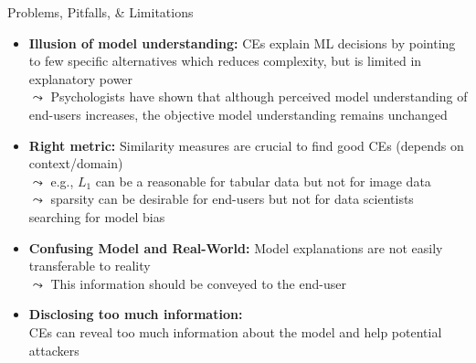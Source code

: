 \documentclass[11pt,compress,t,notes=noshow, aspectratio=169, xcolor=table]{beamer}
\begin{document}
\begin{frame}{Problems, Pitfalls, \& Limitations}
\begin{itemize}[<+->]
    \item \textbf{Illusion of model understanding:} 
    CEs explain ML decisions by pointing to few specific alternatives which reduces complexity, but is limited in explanatory power\\
    $\leadsto$ %
    Psychologists have shown that although perceived model understanding of end-users increases, the objective model understanding remains unchanged
    
    \item \textbf{Right metric:} Similarity measures are crucial to find good CEs (depends on context/domain)\\
    $\leadsto$ e.g., $L_1$ can be a reasonable for tabular data but not for image data\\
    $\leadsto$ sparsity can be desirable for end-users but not for data scientists searching for model bias

    \item \textbf{Confusing Model and Real-World:} Model explanations are not easily transferable to reality\\
    $\leadsto$ This information should be conveyed to the end-user
    \item \textbf{Disclosing too much information:} \\
    CEs can reveal too much information about the model and help potential attackers
    \end{itemize}
\end{frame}
\end{document}
